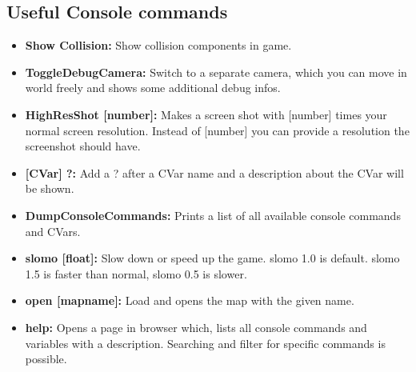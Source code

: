 \documentclass[10pt,a4paper]{article}
\begin{document}
\begin{multicols*}{2}
	\section{Useful Console commands}
	\begin{itemize}
		\item \textbf{Show Collision:} Show collision components in game.
		\item \textbf{ToggleDebugCamera:} Switch to a separate camera, which you can move in world freely and shows some additional debug infos.
		\item \textbf{HighResShot [number]:} Makes a screen shot with [number] times your normal screen resolution. Instead of [number] you can provide a resolution the screenshot should have.
		\item \textbf{[CVar] ?:} Add a ? after a CVar name and a description about the CVar will be shown.
		\item \textbf{DumpConsoleCommands:} Prints a list of all available console commands and CVars.
		\item \textbf{slomo [float]:} Slow down or speed up the game. slomo 1.0 is default. slomo 1.5 is faster than normal, slomo 0.5 is slower.
		\item \textbf {open [mapname]:} Load and opens the map with the given name.
		\item \textbf{help:} Opens a page in browser which, lists all console commands and variables with a description. Searching and filter for specific commands is possible.
	\end{itemize}
	
\end{multicols*}
	
	\pagebreak
	
\end{document}
